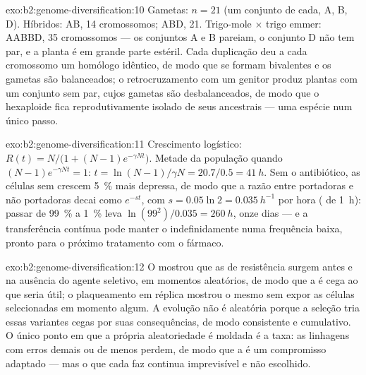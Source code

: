 \begin{solution}{exo:b2:genome-diversification:10}
Gametas: $n = 21$ (um conjunto de cada, A, B, D). Híbridos: AB, 14
cromossomos; ABD, 21. Trigo-mole $\times$ trigo emmer: AABBD, 35
cromossomos --- os conjuntos A e B pareiam, o conjunto D não tem par,
e a planta é em grande parte estéril. Cada duplicação deu a cada
cromossomo um homólogo idêntico, de modo que se formam bivalentes e os
gametas são balanceados; o retrocruzamento com um genitor produz
plantas com um conjunto sem par, cujos gametas são desbalanceados, de
modo que o hexaploide fica reprodutivamente isolado de seus ancestrais
--- uma espécie num único passo.
\end{solution}

\begin{solution}{exo:b2:genome-diversification:11}
Crescimento logístico: $R(t) = N/\bigl(1 + (N - 1)e^{-\gamma Nt}\bigr)$.
Metade da população quando $(N - 1)e^{-\gamma Nt} = 1$: $t = \ln(N -
1)/\gamma N = 20.7/0.5 = \qty{41}{h}$. Sem o antibiótico, as células
sem  crescem \qty{5}{\%} mais depressa, de modo que a razão
entre portadoras e não portadoras decai como $e^{-st}$, com $s = 0.05\ln 2 =
\qty{0.035}{h^{-1}}$ por hora ( de \qty{1}{h}): passar
de \qty{99}{\%} a \qty{1}{\%} leva $\ln(99^2)/0.035 = \qty{260}{h}$,
onze dias --- e a transferência contínua pode manter o 
indefinidamente numa frequência baixa, pronto para o próximo
tratamento com o fármaco.
\end{solution}

\begin{solution}{exo:b2:genome-diversification:12}
O  mostrou que as  de resistência surgem
antes e na ausência do agente seletivo, em momentos aleatórios, de
modo que a  é cega ao que seria útil; o plaqueamento em réplica
mostrou o mesmo sem expor as células selecionadas em momento algum. A
evolução não é aleatória porque a seleção tria essas variantes cegas
por suas consequências, de modo consistente e cumulativo. O único
ponto em que a própria aleatoriedade é moldada é a taxa: as linhagens
com erros demais ou de menos perdem, de modo que a  é
um compromisso adaptado --- mas o que cada  faz continua
imprevisível e não escolhido.
\end{solution}

